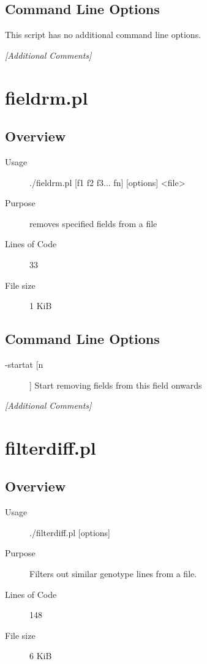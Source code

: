 \subsection{Command Line Options}
\label{sec:emp-fst.pl-command-line}

This script has no additional command line options.

\emph{[Additional Comments]}

\section{fieldrm.pl}
\label{sec:fieldrm.pl}

\subsection{Overview}
\label{sec:fieldrm.pl-overview}

\begin{description}
\item[Usage] ./fieldrm.pl [f1 f2 f3... fn] [options] <file>
\item[Purpose] removes specified fields from a file
\item[Lines of Code] 33
\item[File size] 1 KiB
\end{description}

\subsection{Command Line Options}
\label{sec:fieldrm.pl-command-line}

\begin{description}
\item[-startat [n]] Start removing fields from this field onwards
\end{description}

\emph{[Additional Comments]}

\section{filterdiff.pl}
\label{sec:filterdiff.pl}

\subsection{Overview}
\label{sec:filterdiff.pl-overview}

\begin{description}
\item[Usage] ./filterdiff.pl [options]
\item[Purpose] Filters out similar genotype lines from a file.
\item[Lines of Code] 148
\item[File size] 6 KiB
\end{description}

